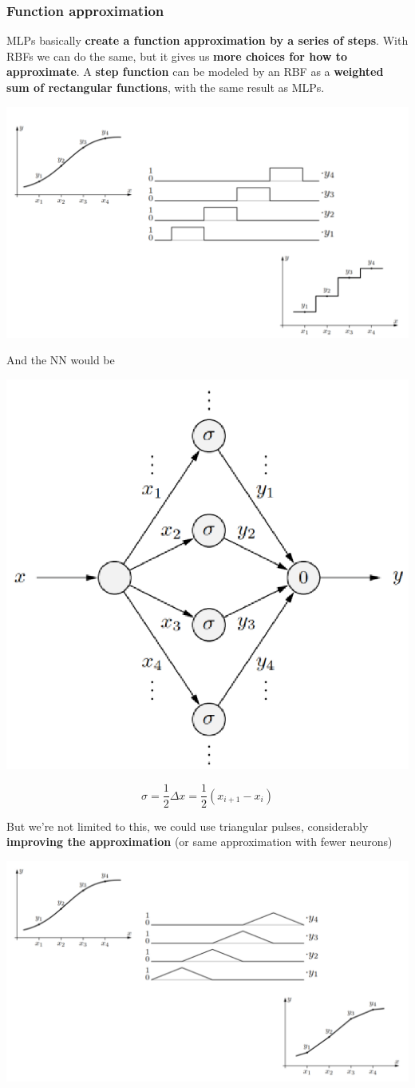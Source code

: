 \subsubsection{Function approximation}
MLPs basically \textbf{create a function approximation by a series of steps}. With RBFs we can do the same, but it gives us \textbf{more choices for how to approximate}. A \textbf{step function} can be modeled by an RBF as a \textbf{weighted sum of rectangular functions}, with the same result as MLPs. 
\begin{center}
	\includegraphics[width=0.85\columnwidth]{img/NN/FA1}
\end{center}

\newpage

And the NN would be
\begin{center}
	\includegraphics[width=0.5\columnwidth]{img/NN/FA2}
\end{center}
$$ \sigma = \frac{1}{2} \Delta x = \frac{1}{2} (x_{i+1} - x_i)$$

But we're not limited to this, we could use triangular pulses, considerably \textbf{improving the approximation} (or same approximation with fewer neurons)
\begin{center}
	\includegraphics[width=0.85\columnwidth]{img/NN/FA3}
\end{center}

